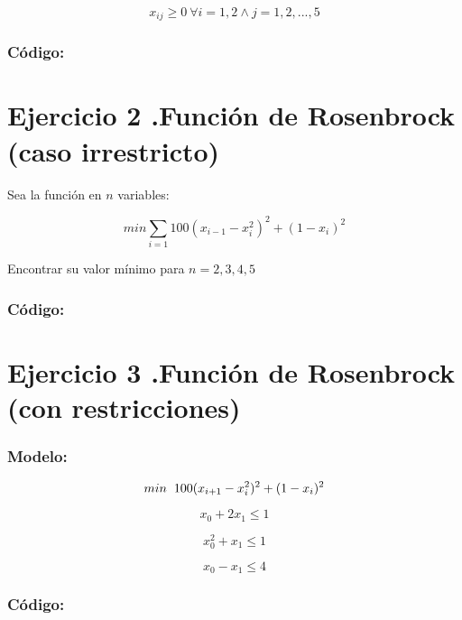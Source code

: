 \documentclass[]{article}
\begin{document}
$$ x_{ij} \geq 0\ \forall i = 1,2 \land j = 1, 2, ..., 5 $$

\subsubsection*{C\'odigo:}



\section*{Ejercicio 2 .Funci\'on de Rosenbrock (caso irrestricto)}

\begin{flushleft}
	Sea la funci\'on en $n$ variables:
\end{flushleft}

$$ min \sum_{i=1} 100 \left(x_{i-1}- x_{i}^{2} \right)^{2} + \left(1-x_{i}\right)^{2} $$

\begin{flushleft}
	Encontrar su valor m\'inimo para $n = 2,3,4,5$ 
\end{flushleft}

\subsubsection*{C\'odigo:}



\section*{Ejercicio 3 .Funci\'on de Rosenbrock (con restricciones)}

\subsubsection*{Modelo:}

$$ min \hspace{0.2cm} 100(x_{i+1} - x_i^2)^2 + (1 - x_i)^2 $$

$$ x_{0} + 2x_{1} \leq 1 $$

$$ x_{0}^{2} + x_{1} \leq 1 $$

$$ x_{0} - x_{1} \leq 4 $$

\subsubsection*{C\'odigo:}
\end{document}
